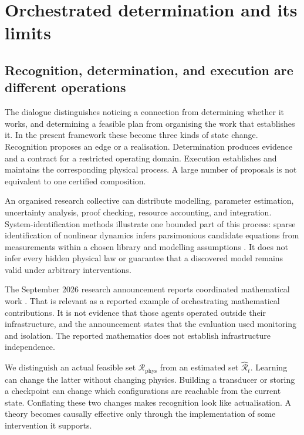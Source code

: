 \documentclass[11pt,a4paper]{article}
\theoremstyle{definition}
\theoremstyle{remark}
\begin{document}


\section{Orchestrated determination and its limits}\label{sec:discovery}
\subsection{Recognition, determination, and execution are different operations}
The dialogue distinguishes noticing a connection from determining whether it works, and determining a feasible plan from organising the work that establishes it. In the present framework these become three kinds of state change. Recognition proposes an edge or a realisation. Determination produces evidence and a contract for a restricted operating domain. Execution establishes and maintains the corresponding physical process. A large number of proposals is not equivalent to one certified composition.

An organised research collective can distribute modelling, parameter estimation, uncertainty analysis, proof checking, resource accounting, and integration. System-identification methods illustrate one bounded part of this process: sparse identification of nonlinear dynamics infers parsimonious candidate equations from measurements within a chosen library and modelling assumptions \citep{sindy}. It does not infer every hidden physical law or guarantee that a discovered model remains valid under arbitrary interventions.

The September 2026 research announcement reports coordinated mathematical work \citep{openaiannounce}. That is relevant as a reported example of orchestrating mathematical contributions. It is not evidence that those agents operated outside their infrastructure, and the announcement states that the evaluation used monitoring and isolation. The reported mathematics does not establish infrastructure independence.

We distinguish an actual feasible set $\mathscr R_{\mathrm{phys}}$ from an estimated set $\widehat{\mathscr R}_t$. Learning can change the latter without changing physics. Building a transducer or storing a checkpoint can change which configurations are reachable from the current state. Conflating these two changes makes recognition look like actualisation. A theory becomes causally effective only through the implementation of some intervention it supports.
\end{document}
